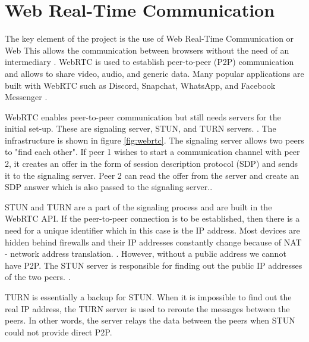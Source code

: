 \documentclass{l4proj}
\begin{document}
\section{Web Real-Time Communication}
The key element of the project is the use of Web Real-Time Communication or Web This allows the communication between browsers without the need of an intermediary \cite{rtc}. WebRTC is used to establish peer-to-peer (P2P) communication and allows to share video, audio, and generic data. Many popular applications are built with WebRTC such as Discord, Snapchat, WhatsApp, and Facebook Messenger \cite{rtc_use}. \par
WebRTC enables peer-to-peer communication but still needs servers for the initial set-up. These are signaling server, STUN, and TURN servers. \cite{rtc_infra}. The infrastructure is shown in figure \ref{fig:webrtc}. The signaling server allows two peers to "find each other". If peer 1 wishes to start a communication channel with peer 2, it creates an offer in the form of session description protocol (SDP) and sends it to the signaling server. Peer 2 can read the offer from the server and create an SDP answer which is also passed to the signaling server.\cite{rtc_in_100}. \par 
STUN and TURN are a part of the signaling process and are built in the WebRTC API. If the peer-to-peer connection is to be established, then there is a need for a unique identifier which in this case is the IP address. Most devices are hidden behind firewalls and their IP addresses constantly change because of NAT - network address translation. \cite{stun_turn}. However, without a public address we cannot have P2P. The STUN server is responsible for finding out the public IP addresses of the two peers. \cite{rtc_infra}. \par
TURN is essentially a backup for STUN. When it is impossible to find out the real IP address, the TURN server is used to reroute the messages between the peers. \cite{server} In other words, the server relays the data between the peers when STUN could not provide direct P2P. 
\end{document}
